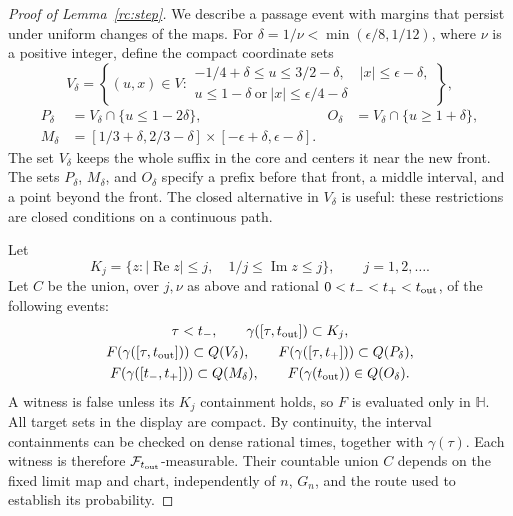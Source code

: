 \begin{proof}[Proof of Lemma~\ref{rc:step}]
We describe a passage event with margins that persist under uniform
changes of the maps. For $\delta=1/\nu<\min(\epsilon/8,1/12)$, where
$\nu$ is a positive integer, define the compact coordinate sets
\[
 V_\delta=\left\{(u,x)\in V:
 \begin{gathered}
 -1/4+\delta\le u\le3/2-\delta,\quad |x|\le\epsilon-\delta,\\
 u\le1-\delta\ \text{or}\ |x|\le\epsilon/4-\delta
 \end{gathered}\right\},
\]
\[
 \begin{aligned}
 P_\delta&=V_\delta\cap\{u\le1-2\delta\},&
 O_\delta&=V_\delta\cap\{u\ge1+\delta\},\\
 M_\delta&=[1/3+\delta,2/3-\delta]
                  \times[-\epsilon+\delta,\epsilon-\delta].
 \end{aligned}
\]
The set $V_\delta$ keeps the whole suffix in the core and centers it
near the new front. The sets $P_\delta$, $M_\delta$, and $O_\delta$
specify a prefix before that front, a middle interval, and a point
beyond the front. The closed alternative in $V_\delta$ is useful:
these restrictions are closed conditions on a continuous path.

Let
\[
 K_j=\{z:|\operatorname{Re}z|\le j,\quad
                1/j\le\operatorname{Im}z\le j\},\qquad j=1,2,\ldots.
\]
Let $C$ be the union, over $j,\nu$ as above and rational
$0<t_-<t_+<t_{\rm out}$, of the following events:
\[
 \begin{gathered}
 \tau<t_-,\qquad \gamma([\tau,t_{\rm out}])\subset K_j,\\
 F(\gamma([\tau,t_{\rm out}]))\subset Q(V_\delta),\qquad
 F(\gamma([\tau,t_+]))\subset Q(P_\delta),\\
 F(\gamma([t_-,t_+]))\subset Q(M_\delta),\qquad
 F(\gamma(t_{\rm out}))\in Q(O_\delta).
 \end{gathered}
\]
A witness is false unless its $K_j$ containment holds, so $F$ is
evaluated only in $\mathbb H$. All target sets in the display are
compact. By continuity, the interval containments can be checked on
dense rational times, together with $\gamma(\tau)$. Each witness is
therefore $\mathcal F_{t_{\rm out}}$-measurable. Their countable union
$C$ depends on the fixed limit map and chart, independently of $n$,
$G_n$, and the route used to establish its probability.


\end{proof}
